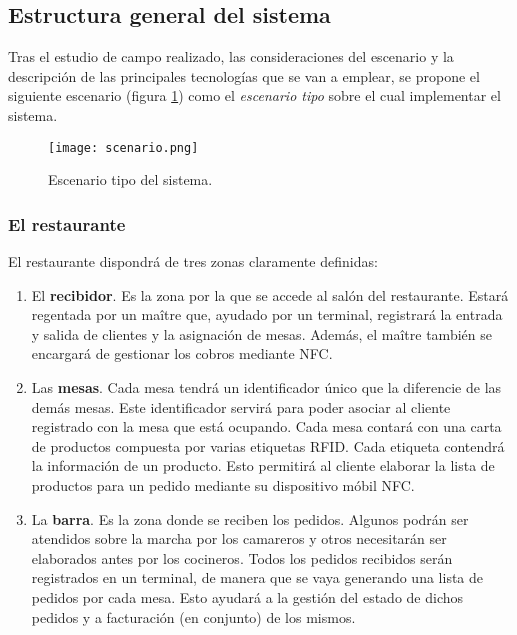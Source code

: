 %

  \subsection{Estructura general del sistema}
Tras el estudio de campo realizado, las consideraciones del escenario y la
descripción de las principales tecnologías que se van a emplear, se propone
el siguiente escenario (figura \ref{fig:scenario}) como el \emph{escenario
tipo} sobre el cual implementar el sistema.

\begin{figure}[!h]
  \begin{center}
    \texttt{[image: scenario.png]}
    \caption{Escenario tipo del sistema.}
    \label{fig:scenario}
  \end{center}
\end{figure}

    \subsubsection{El restaurante}
  El restaurante dispondrá de tres zonas claramente definidas:
  \begin{enumerate}
  \item El \textbf{recibidor}. Es la zona por la que se accede al salón del
  restaurante. Estará regentada por un maître que, ayudado por un terminal,
  registrará la entrada y salida de clientes y la asignación de mesas.
  Además, el maître también se encargará de gestionar los cobros mediante
  \acs{NFC}.
  \item Las \textbf{mesas}. Cada mesa tendrá un identificador único que la
  diferencie de las demás mesas. Este identificador servirá para poder
  asociar al cliente registrado con la mesa que está ocupando. Cada mesa
  contará con una carta de productos compuesta por varias etiquetas
  \acs{RFID}. Cada etiqueta contendrá la información de un producto. Esto 
  permitirá al cliente elaborar la lista de productos para un pedido
  mediante su dispositivo móbil \acs{NFC}.
  \item La \textbf{barra}. Es la zona donde se reciben los pedidos. Algunos
  podrán ser atendidos sobre la marcha por los camareros y otros necesitarán
  ser elaborados antes por los cocineros. Todos los pedidos recibidos serán
  registrados en un terminal, de manera que se vaya generando una lista de
  pedidos por cada mesa. Esto ayudará a la gestión del estado de dichos 
  pedidos y a facturación (en conjunto) de los mismos.
  \end{enumerate}

